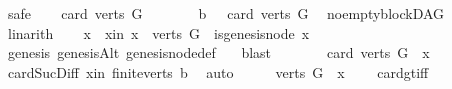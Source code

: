 \begin{isabellebody}
%
\isadelimproof
%
\endisadelimproof
%
\isatagproof
{}\isamarkupfalse%
\ safe\isanewline
\ \ \isamarkupfalse%
\ {\isachardoublequoteopen}card\ {\isacharparenleft}{\kern0pt}verts\ G{\isacharparenright}{\kern0pt}\ {\isachargreater}{\kern0pt}\ {}{\isachardoublequoteclose}\isanewline
\ \ \isamarkupfalse%
\ \isamarkupfalse%
\ b{}{\isacharcolon}{\kern0pt}\ {\isachardoublequoteopen}{}\ {\isacharless}{\kern0pt}\ card\ {\isacharparenleft}{\kern0pt}verts\ G{\isacharparenright}{\kern0pt}{\isachardoublequoteclose}\ \isamarkupfalse%
\ no{\isacharunderscore}{\kern0pt}empty{\isacharunderscore}{\kern0pt}blockDAG\ \isamarkupfalse%
\ linarith\isanewline
\ \ \isamarkupfalse%
\ x\ \ x{\isacharunderscore}{\kern0pt}in{\isacharcolon}{\kern0pt}\ {\isachardoublequoteopen}x\ {\isasymin}\ {\isacharparenleft}{\kern0pt}verts\ G{\isacharparenright}{\kern0pt}\ {\isasymand}\ is{\isacharunderscore}{\kern0pt}genesis{\isacharunderscore}{\kern0pt}node\ x{\isachardoublequoteclose}\ \isanewline
\ \ \ \ \isamarkupfalse%
\ genesis\ genesisAlt\ genesis{\isacharunderscore}{\kern0pt}node{\isacharunderscore}{\kern0pt}def\ \ \isamarkupfalse%
\ blast\isanewline
\ \ \isamarkupfalse%
\ \isamarkupfalse%
\ {\isachardoublequoteopen}{}\ {\isacharless}{\kern0pt}\ card\ {\isacharparenleft}{\kern0pt}{\isacharparenleft}{\kern0pt}verts\ G{\isacharparenright}{\kern0pt}\ {\isacharminus}{\kern0pt}\ {\isacharbraceleft}{\kern0pt}x{\isacharbraceright}{\kern0pt}{\isacharparenright}{\kern0pt}{\isachardoublequoteclose}\ \isamarkupfalse%
\ card{\isacharunderscore}{\kern0pt}Suc{\isacharunderscore}{\kern0pt}Diff{}\ x{\isacharunderscore}{\kern0pt}in\ finite{\isacharunderscore}{\kern0pt}verts\ b{}\ \isamarkupfalse%
\ auto\isanewline
\ \ \isamarkupfalse%
\ \isamarkupfalse%
\ {\isachardoublequoteopen}{\isacharparenleft}{\kern0pt}{\isacharparenleft}{\kern0pt}verts\ G{\isacharparenright}{\kern0pt}\ {\isacharminus}{\kern0pt}\ {\isacharbraceleft}{\kern0pt}x{\isacharbraceright}{\kern0pt}{\isacharparenright}{\kern0pt}\ {\isasymnoteq}\ {\isacharbraceleft}{\kern0pt}{\isacharbraceright}{\kern0pt}{\isachardoublequoteclose}\ \isamarkupfalse%
\ card{\isacharunderscore}{\kern0pt}gt{\isacharunderscore}{\kern0pt}{}{\isacharunderscore}{\kern0pt}iff\ \isamarkupfalse%

\end{isabellebody}

